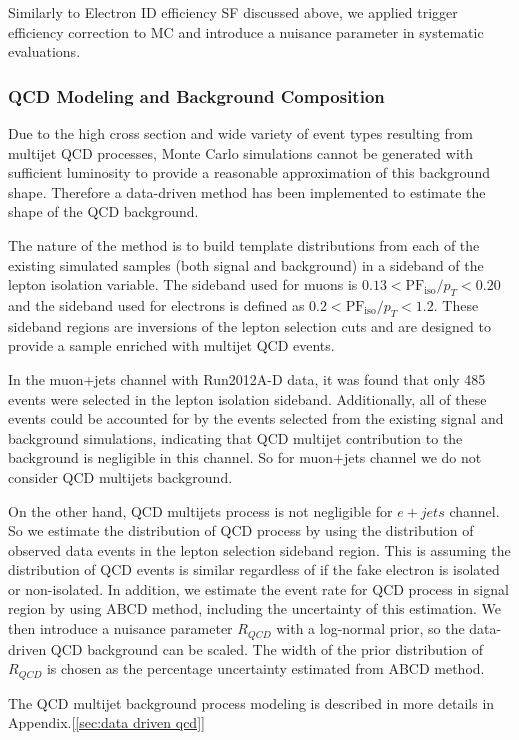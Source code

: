Similarly to Electron ID efficiency SF discussed above, we applied trigger efficiency correction to MC and introduce a nuisance parameter in systematic evaluations. 


\subsubsection{QCD Modeling and Background Composition}

Due to the high cross section and wide variety of event types resulting from multijet QCD processes, Monte Carlo simulations cannot be generated with sufficient luminosity to provide a reasonable approximation of this background shape. Therefore a data-driven method has been implemented to estimate the shape of the QCD background.

The nature of the method is to build template distributions from each of the existing simulated samples (both signal and background) in a sideband of the lepton isolation variable. The sideband used for muons is $0.13<\mathrm{PF}_\mathrm{iso}/p_{T}<0.20$ and the sideband used for electrons is defined as  $0.2<\mathrm{PF}_\mathrm{iso}/p_{T}<1.2$. These sideband regions are inversions of the lepton selection cuts and are designed to provide a sample enriched with multijet QCD events.

In the muon+jets channel with Run2012A-D data, it was found that only 485 events were selected in the lepton isolation sideband. Additionally, all of these events could be accounted for by the events selected from the existing signal and background simulations, indicating that QCD multijet contribution to the background is negligible in this channel. So for muon+jets channel we do not consider QCD multijets background.

On the other hand, QCD multijets process is not negligible for $e+jets$ channel. So we estimate the distribution of QCD process by using the distribution of observed data events in the lepton selection sideband region. This is assuming the distribution of QCD events is similar regardless of if the fake electron is isolated or non-isolated. In addition, we estimate the event rate for QCD process in signal region by using ABCD method, including the uncertainty of this estimation. We then introduce a nuisance parameter $R_{QCD}$ with a log-normal prior, so the data-driven QCD background can be scaled. The width of the prior distribution of $R_{QCD}$ is chosen as the percentage uncertainty estimated from ABCD method. 

The QCD multijet background process modeling is described in more details in Appendix.[\ref{sec:data driven qcd}]

